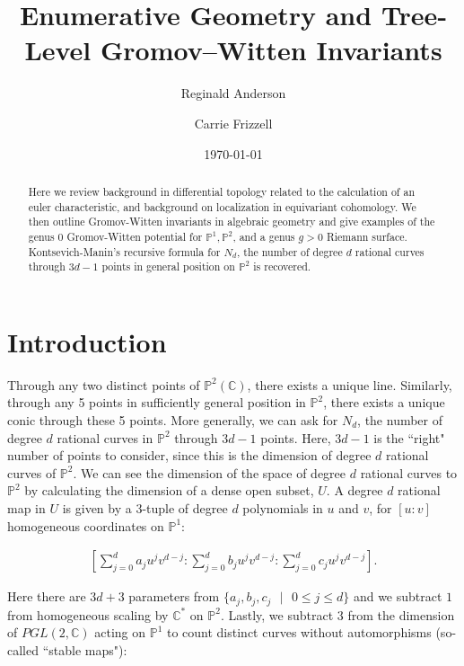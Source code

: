 \documentclass{amsart}
\title{Enumerative Geometry and Tree-Level Gromov--Witten Invariants}
\author{Reginald Anderson}
\author{Carrie Frizzell}
\date{\today}
\newcommand{\PP}{\mathbb{P}}\newcommand{\A}{\mathbb{A}}\newcommand{\Z}{\mathbb{Z}}\newcommand{\C}{\mathbb{C}}\newcommand{\N}{\mathbb{N}}\newcommand{\T}{\mathbb{T}}
\begin{document}
\begin{abstract} Here we review background in differential topology related to the calculation of an euler characteristic, and background on localization in equivariant cohomology. We then outline Gromov-Witten invariants in algebraic geometry and give examples of the genus 0 Gromov-Witten potential for $\PP^1, \PP^2$, and a genus $g>0$ Riemann surface. Kontsevich-Manin's recursive formula for $N_d$, the number of degree $d$ rational curves through $3d-1$ points in general position on $\PP^2$ is recovered. 

\end{abstract} 


\maketitle

\tableofcontents


    
\section{Introduction}

Through any two distinct points of $\PP^2(\C)$, there exists a unique line. Similarly, through any 5 points in sufficiently general position in $\PP^2$, there exists a unique conic through these 5 points. More generally, we can ask for $N_d$, the number of degree $d$ rational curves in $\PP^2$ through $3d-1$ points. Here, $3d-1$ is the ``right" number of points to consider, since this is the dimension of degree $d$ rational curves of $\PP^2$. We can see the dimension of the space of degree $d$ rational curves to $\PP^2$ by calculating the dimension of a dense open subset, $U$. A degree $d$ rational map in $U$ is given by a 3-tuple of degree $d$ polynomials in $u$ and $v$, for $[u:v]$ homogeneous coordinates on $\PP^1:$

\begin{align*}
    \left[ \sum_{j=0}^d a_j u^j v^{d-j} : \sum_{j=0}^d b_j u^j v^{d-j} : \sum_{j=0}^d c_j u^j v^{d-j} \right]. 
\end{align*}

Here there are $3d+3$ parameters from $\{a_j, b_j, c_j \text{ }|\text{ }0 \leq j \leq d \}$ and we subtract $1$ from homogeneous scaling by $\C^*$ on $\PP^2$. Lastly, we subtract $3$ from the dimension of $PGL(2,\C)$ acting on $\PP^1$ to count distinct curves without automorphisms (so-called ``stable maps"):
\end{document}
